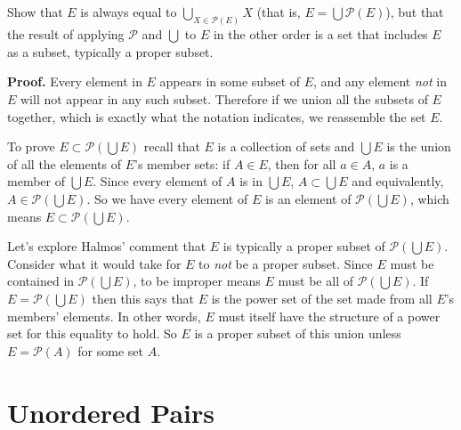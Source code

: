 \documentclass{article}
\begin{document}
\subsection{} Show that $E$ is always equal to $\bigcup_{X \in \mathscr{P}(E)}X$ (that is, $E = \bigcup \mathscr{P}(E)$), but that the result of applying $\mathscr{P}$ and $\bigcup$ to $E$ in the other order is a set that includes $E$ as a subset, typically a proper subset.

\textbf{Proof.} Every element in $E$ appears in some subset of $E$, and any element \textit{not} in $E$ will not appear in any such subset. Therefore if we union all the subsets of $E$ together, which is exactly what the notation indicates, we reassemble the set $E$.

To prove $E \subset \mathscr{P}\left(\bigcup E\right)$ recall that $E$ is a collection of sets and $\bigcup E$ is the union of all the elements of $E$'s member sets: if $A \in E$, then for all $a \in A$, $a$ is a member of $\bigcup E$. Since every element of $A$ is in $\bigcup E$, $A \subset \bigcup E$ and equivalently, $A \in \mathscr{P}(\bigcup E)$. So we have every element of $E$ is an element of $\mathscr{P}(\bigcup E)$, which means $E \subset \mathscr{P}(\bigcup E)$. 

Let's explore Halmos' comment that $E$ is typically a proper subset of $\mathscr{P}(\bigcup E)$. Consider what it would take for $E$ to \textit{not} be a proper subset. Since $E$ must be contained in $\mathscr{P}\left(\bigcup E\right)$, to be improper means $E$ must be all of $\mathscr{P}\left(\bigcup E\right)$. If $E = \mathscr{P}\left(\bigcup E\right)$ then this says that $E$ is the power set of the set made from all $E$'s members' elements. In other words, $E$ must itself have the structure of a power set for this equality to hold. So $E$ is a proper subset of this union unless $E = \mathscr{P}(A)$ for some set $A$.

\section{Unordered Pairs}
\end{document}
